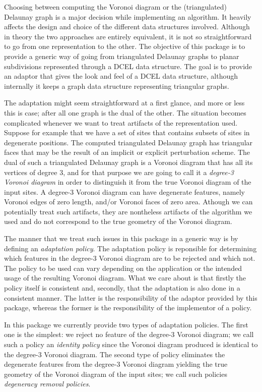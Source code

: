 Choosing between computing the Voronoi diagram or the (triangulated)
Delaunay graph is a major decision while implementing an algorithm. It
heavily affects the design and choice of the different data structures
involved. Although in theory the two approaches are entirely
equivalent, it is not so straightforward to go from one representation
to the other. The objective of this package is to provide a generic
way of going from triangulated Delaunay graphs to planar
subdivisions represented through a DCEL data structure. The goal is to
provide an adaptor that gives the look and feel of a DCEL data structure,
although internally it keeps a graph data structure representing
triangular graphs.

The adaptation might seem straightforward at a first glance, and more
or less this is case; after all one graph is the dual of the
other. The situation becomes complicated whenever we want to treat
artifacts of the representation used. Suppose for example that we have
a set of sites that contains subsets of sites in degenerate
positions. The computed triangulated Delaunay graph has triangular
faces that may be the result of an implicit or explicit perturbation
scheme. The dual of such a triangulated Delaunay graph is a Voronoi
diagram that has all its vertices of degree 3, and for that purpose we
are going to call it a \emph{degree-3 Voronoi diagram} in order to
distinguish it from the true Voronoi diagram of the input sites. A
degree-3 Voronoi diagram can have degenerate features, namely Voronoi
edges of zero length, and/or Voronoi faces of zero area. Athough we
can potentially treat such artifacts, they are nontheless artifacts of
the algorithm we used and do not correspond to the true geometry of
the Voronoi diagram.

The manner that we treat such issues in this package in a generic way
is by defining an \emph{adaptation policy}. The adaptation policy is
reponsible for determining which features in the degree-3 Voronoi
diagram are to be rejected and which not. The policy to be used can
vary depending on the application or the intended usage of the
resulting Voronoi diagram. What we care about is that firstly the
policy itself is consistent and, secondly, that the adaptation is also
done in a consistent manner. The latter is the responsibility of the
adaptor provided by this package, whereas the former is the
responsibility of the implementor of a policy.

In this package we currently provide two types of adaptation
policies. The first one is the simplest: we reject no feature of the
degree-3 Voronoi diagram; we call such a policy an
\emph{identity policy} since the Voronoi diagram produced is identical
to the degree-3 Voronoi diagram. The second type of policy eliminates
the degenerate features from the degree-3 Voronoi diagram yielding
the true geometry of the Voronoi diagram of the input sites; we call
such policies \emph{degeneracy removal policies}.

